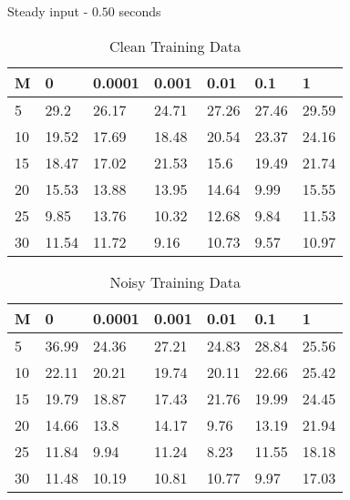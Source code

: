 \documentclass{beamer}
\begin{document}
\begin{frame}{Steady input - $0.50$ seconds}
    \scriptsize
    \begin{table}[!ht]
        \centering
        \begin{tabular}{|l|l|l|l|l|l|l|}
        \hline
            M & 0 & 0.0001 & 0.001 & 0.01 & 0.1 & 1 \\ \hline
            5 & 29.2 & 26.17 & 24.71 & 27.26 & 27.46 & 29.59 \\ \hline
            10 & 19.52 & 17.69 & 18.48 & 20.54 & 23.37 & 24.16 \\ \hline
            15 & 18.47 & 17.02 & 21.53 & 15.6 & 19.49 & 21.74 \\ \hline
            20 & 15.53 & 13.88 & 13.95 & 14.64 & 9.99 & 15.55 \\ \hline
            25 & 9.85 & 13.76 & 10.32 & 12.68 & 9.84 & 11.53 \\ \hline
            30 & 11.54 & 11.72 & 9.16 & 10.73 & 9.57 & 10.97 \\ \hline
        \end{tabular}
        \caption{Clean Training Data}
    \end{table}

    \begin{table}[!ht]
        \centering
        \begin{tabular}{|l|l|l|l|l|l|l|}
        \hline
            M & 0 & 0.0001 & 0.001 & 0.01 & 0.1 & 1 \\ \hline
            5 & 36.99 & 24.36 & 27.21 & 24.83 & 28.84 & 25.56 \\ \hline
            10 & 22.11 & 20.21 & 19.74 & 20.11 & 22.66 & 25.42 \\ \hline
            15 & 19.79 & 18.87 & 17.43 & 21.76 & 19.99 & 24.45 \\ \hline
            20 & 14.66 & 13.8 & 14.17 & 9.76 & 13.19 & 21.94 \\ \hline
            25 & 11.84 & 9.94 & 11.24 & 8.23 & 11.55 & 18.18 \\ \hline
            30 & 11.48 & 10.19 & 10.81 & 10.77 & 9.97 & 17.03 \\ \hline
        \end{tabular}
        \caption{Noisy Training Data}
    \end{table}
\end{frame}
\end{document}

